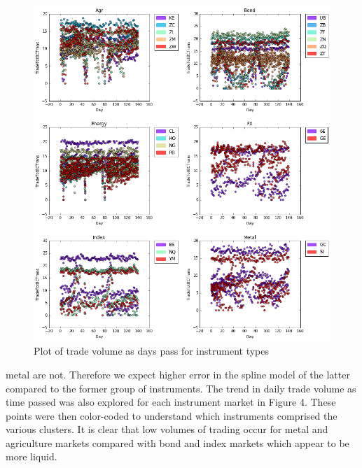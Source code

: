 \documentclass[12pt]{article}
\begin{document}
\begin{figure}[H]
	\begin{center}	
		\includegraphics[width=15cm]{agr_scatter_transMat.png} %
		\caption{Plot of trade volume as days pass for instrument types}
		\label{fig:3}
	\end{center}
\end{figure}

\noindent metal are not. Therefore we expect higher error in the spline model of the latter compared to the former group of instruments. The trend in daily trade volume as time passed was also explored for each instrument market in Figure 4.  These points were then color-coded to understand which instruments comprised the various clusters. It is clear that low volumes of trading occur for metal and agriculture markets compared with bond and index markets which appear to be more liquid. 
\end{document}
